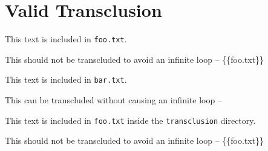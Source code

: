 
\def\mytitle{MultiMarkdown Transclusion Test}


\part{Valid Transclusion}
\label{validtransclusion}

This text is included in \texttt{foo.txt}.

This should not be transcluded to avoid an infinite loop -- \{\{foo.txt\}\}

This text is included in \texttt{bar.txt}.

This can be transcluded without causing an infinite loop -- 

This text is included in \texttt{foo.txt} inside the \texttt{transclusion} directory.

This should not be transcluded to avoid an infinite loop -- \{\{foo.txt\}\}




